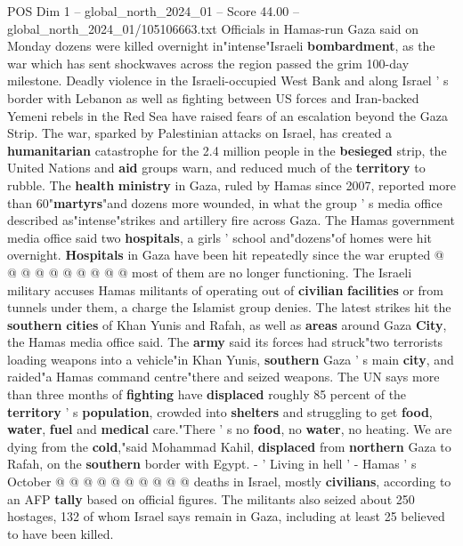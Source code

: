 \begin{textsample}{POS Dim 1 – global\_north\_2024\_01 – Score 44.00 – global\_north\_2024\_01/105106663.txt}  \label{ex:f1_pos_155}
Officials in Hamas-run Gaza said on Monday dozens were killed overnight in"intense"Israeli \textbf{bombardment}, as the war which has sent shockwaves across the region passed the grim 100-day milestone.
Deadly violence in the Israeli-occupied West Bank and along Israel ' s border with Lebanon as well as fighting between US forces and Iran-backed Yemeni rebels in the Red Sea have raised fears of an escalation beyond the Gaza Strip.
The war, sparked by Palestinian attacks on Israel, has created a \textbf{humanitarian} catastrophe for the 2.4 million people in the \textbf{besieged} strip, the United Nations and \textbf{aid} groups warn, and reduced much of the \textbf{territory} to rubble.
The \textbf{health} \textbf{ministry} in Gaza, ruled by Hamas since 2007, reported more than 60"\textbf{martyrs}"and dozens more wounded, in what the group ' s media office described as"intense"strikes and artillery fire across Gaza.
The Hamas government media office said two \textbf{hospitals}, a girls ' school and"dozens"of homes were hit overnight. \textbf{Hospitals} in Gaza have been hit repeatedly since the war erupted @ @ @ @ @ @ @ @ @ @ most of them are no longer functioning.
The Israeli military accuses Hamas militants of operating out of \textbf{civilian} \textbf{facilities} or from tunnels under them, a charge the Islamist group denies.
The latest strikes hit the \textbf{southern} \textbf{cities} of Khan Yunis and Rafah, as well as \textbf{areas} around Gaza \textbf{City}, the Hamas media office said.
The \textbf{army} said its forces had struck"two terrorists loading weapons into a vehicle"in Khan Yunis, \textbf{southern} Gaza ' s main \textbf{city}, and raided"a Hamas command centre"there and seized weapons.
The UN says more than three months of \textbf{fighting} have \textbf{displaced} roughly 85 percent of the \textbf{territory} ' s \textbf{population}, crowded into \textbf{shelters} and struggling to get \textbf{food}, \textbf{water}, \textbf{fuel} and \textbf{medical} care."There ' s no \textbf{food}, no \textbf{water}, no heating.
We are dying from the \textbf{cold},"said Mohammad Kahil, \textbf{displaced} from \textbf{northern} Gaza to Rafah, on the \textbf{southern} border with Egypt. - ' Living in hell ' - Hamas ' s October @ @ @ @ @ @ @ @ @ @ deaths in Israel, mostly \textbf{civilians}, according to an AFP \textbf{tally} based on official figures.
The militants also seized about 250 hostages, 132 of whom Israel says remain in Gaza, including at least 25 believed to have been killed.

\end{textsample}

